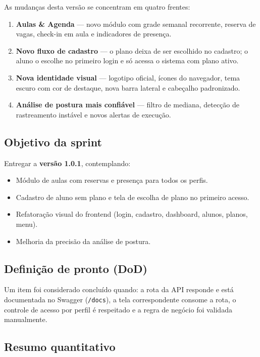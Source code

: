 \documentclass[11pt,a4paper]{article}
\newcommand{\cod}[1]{\texttt{#1}}
\begin{document}
As mudanças desta versão se concentram em quatro frentes:

\begin{enumerate}
  \item \textbf{Aulas \& Agenda} --- novo módulo com grade semanal recorrente, reserva de vagas,
        check-in em aula e indicadores de presença.
  \item \textbf{Novo fluxo de cadastro} --- o plano deixa de ser escolhido no cadastro; o aluno o
        escolhe no primeiro login e só acessa o sistema com plano ativo.
  \item \textbf{Nova identidade visual} --- logotipo oficial, ícones do navegador, tema escuro com
        cor de destaque, nova barra lateral e cabeçalho padronizado.
  \item \textbf{Análise de postura mais confiável} --- filtro de mediana, detecção de rastreamento
        instável e novos alertas de execução.
\end{enumerate}

\subsection{Objetivo da sprint}

Entregar a \textbf{versão 1.0.1}, contemplando:

\begin{itemize}
  \item Módulo de aulas com reservas e presença para todos os perfis.
  \item Cadastro de aluno sem plano e tela de escolha de plano no primeiro acesso.
  \item Refatoração visual do frontend (login, cadastro, dashboard, alunos, planos, menu).
  \item Melhoria da precisão da análise de postura.
\end{itemize}

\subsection{Definição de pronto (DoD)}

Um item foi considerado concluído quando: a rota da API responde e está documentada no
Swagger (\cod{/docs}), a tela correspondente consome a rota, o controle de acesso por perfil é
respeitado e a regra de negócio foi validada manualmente.

\subsection{Resumo quantitativo}
\end{document}

